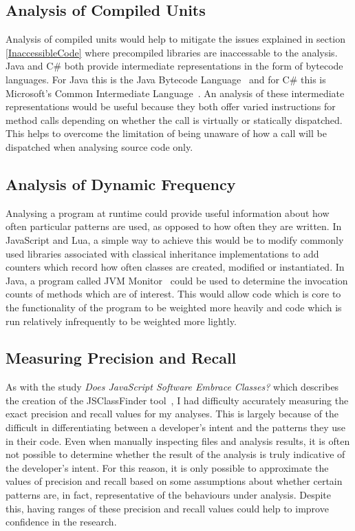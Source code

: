 \subsection{Analysis of Compiled Units}
Analysis of compiled units would help to mitigate the issues explained in section \ref{InaccessibleCode} where precompiled libraries are inaccessable to the analysis. Java and C\# both provide intermediate representations in the form of bytecode languages. For Java this is the Java Bytecode Language~\cite{JVMSpec} and for C\# this is Microsoft's Common Intermediate Language~\cite{CommonIntermediateLanguage}. An analysis of these intermediate representations would be useful because they both offer varied instructions for method calls depending on whether the call is virtually or statically dispatched. This helps to overcome the limitation of being unaware of how a call will be dispatched when analysing source code only.

\subsection{Analysis of Dynamic Frequency}
Analysing a program at runtime could provide useful information about how often particular patterns are used, as opposed to how often they are written. In JavaScript and Lua, a simple way to achieve this would be to modify commonly used libraries associated with classical inheritance implementations to add counters which record how often classes are created, modified or instantiated. In Java, a program called JVM Monitor~\cite{JVMMonitor} could be used to determine the invocation counts of methods which are of interest. This would allow code which is core to the functionality of the program to be weighted more heavily and code which is run relatively infrequently to be weighted more lightly.

\subsection{Measuring Precision and Recall}
As with the study \textit{Does JavaScript Software Embrace Classes?} which describes the creation of the JSClassFinder tool~\cite{JSClassFinder}, I had difficulty accurately measuring the exact precision and recall values for my analyses. This is largely because of the difficult in differentiating between a developer's intent and the patterns they use in their code. Even when manually inspecting files and analysis results, it is often not possible to determine whether the result of the analysis is truly indicative of the developer's intent. For this reason, it is only possible to approximate the values of precision and recall based on some assumptions about whether certain patterns are, in fact, representative of the behaviours under analysis. Despite this, having ranges of these precision and recall values could help to improve confidence in the research.



